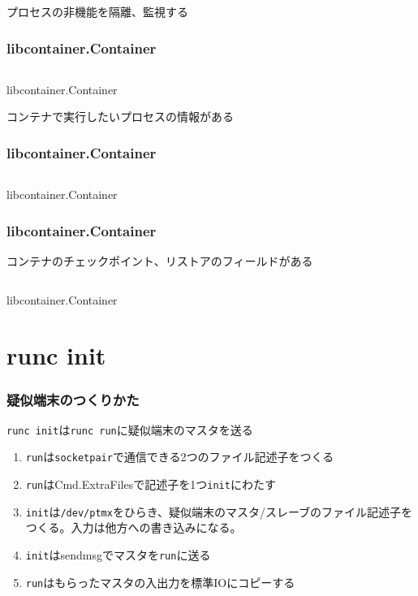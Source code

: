 \documentclass[unicode, 14pt, aspectratio=169]{beamer}
\begin{document}
\begin{frame}[t]
  プロセスの非機能を隔離、監視\supercite{rdt}する
  \frametitle{libcontainer.Container}
  \begin{center}
    \inputminted{go}{code/container2.go}
    libcontainer.Container\supercite{libcontainer}
  \end{center}
\end{frame}
\begin{frame}[t]
  コンテナで実行したいプロセスの情報がある
  \frametitle{libcontainer.Container}
  \begin{center}
    \inputminted{go}{code/container3.go}
    libcontainer.Container\supercite{libcontainer}
  \end{center}
\end{frame}
\begin{frame}[t]
  \frametitle{libcontainer.Container}
  コンテナのチェックポイント、リストアのフィールドがある\supercite{criu}
  \begin{center}
    \inputminted{go}{code/container4.go}
    libcontainer.Container\supercite{libcontainer}
  \end{center}
\end{frame}
\section{runc init}
\begin{frame}[t]
  \frametitle{疑似端末のつくりかた}
  \texttt{runc init}は\texttt{runc run}に疑似端末のマスタを送る
  
  \begin{enumerate}[leftmargin=1.2cm]
  \item \texttt{run}は\texttt{socketpair}で通信できる2つのファイル記述子をつくる
  \item \texttt{run}はCmd.ExtraFilesで記述子を1つ\texttt{init}にわたす 
  \item \texttt{init}は\texttt{/dev/ptmx}をひらき、疑似端末のマスタ/スレーブのファイル記述子をつくる。入力は他方への書き込みになる。
  \item \texttt{init}はsendmsgでマスタを\texttt{run}に送る
  \item \texttt{run}はもらったマスタの入出力を標準IOにコピーする
  \end{enumerate}
\end{frame}
\end{document}

